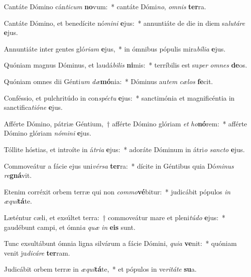 \item Cantáte Dómino cán\textit{ti}\textit{cum} \textbf{no}vum:~* cantáte Dómi\textit{no}, \textit{om}\textit{nis} \textbf{ter}ra.
\item Cantáte Dómino, et benedícite nó\textit{mi}\textit{ni} \textbf{e}jus:~* annuntiáte de die in diem sa\textit{lu}\textit{tá}\textit{re} \textbf{e}jus.
\item Annuntiáte inter gentes gló\textit{ri}\textit{am} \textbf{e}jus,~* in ómnibus pópulis mira\textit{bí}\textit{li}\textit{a} \textbf{e}jus.
\item Quóniam magnus Dóminus, et laudá\textit{bi}\textit{lis} \textbf{ni}mis:~* terríbilis est su\textit{per} \textit{om}\textit{nes} \textbf{de}os.
\item Quóniam omnes dii Génti\textit{um} \textit{dæ}\textbf{mó}nia:~* Dóminus au\textit{tem} \textit{cæ}\textit{los} \textbf{fe}cit.
\item Conféssio, et pulchritúdo in con\textit{spéc}\textit{tu} \textbf{e}jus:~* sanctimónia et magnificéntia in sanctifica\textit{ti}\textit{ó}\textit{ne} \textbf{e}jus.
\item Afférte Dómino, pátriæ Géntium,~† afférte Dómino glóriam \textit{et} \textit{ho}\textbf{nó}rem:~* afférte Dómino glóriam \textit{nó}\textit{mi}\textit{ni} \textbf{e}jus.
\item Tóllite hóstias, et introíte in á\textit{tri}\textit{a} \textbf{e}jus:~* adoráte Dóminum in átri\textit{o} \textit{sanc}\textit{to} \textbf{e}jus.
\item Commoveátur a fácie ejus uni\textit{vér}\textit{sa} \textbf{ter}ra:~* dícite in Géntibus quia Dó\textit{mi}\textit{nus} \textit{re}\textbf{gná}vit.
\item Etenim corréxit orbem terræ qui non \textit{com}\textit{mo}\textbf{vé}bitur:~* judicábit pópulos \textit{in} \textit{æ}\textit{qui}\textbf{tá}te.
\item Læténtur cæli, et exsúltet terra:~† commoveátur mare et pleni\textit{tú}\textit{do} \textbf{e}jus:~* gaudébunt campi, et ómni\textit{a} \textit{quæ} \textit{in} \textbf{e}\textbf{is} sunt.
\item Tunc exsultábunt ómnia ligna silvárum a fácie Dómini, \textit{qui}\textit{a} \textbf{ve}nit:~* quóniam venit ju\textit{di}\textit{cá}\textit{re} \textbf{ter}ram.
\item Judicábit orbem terræ in \textit{æ}\textit{qui}\textbf{tá}te,~* et pópulos in ve\textit{ri}\textit{tá}\textit{te} \textbf{su}a.
